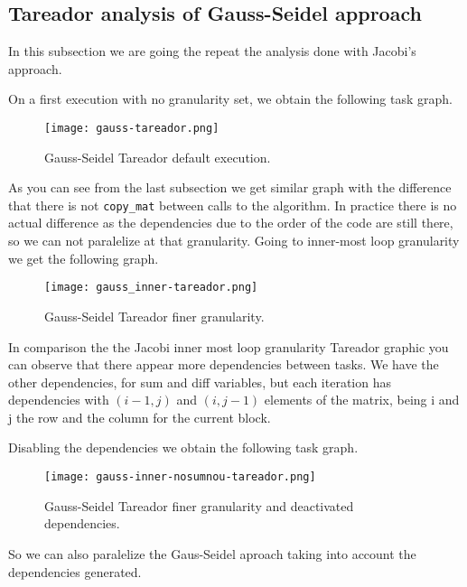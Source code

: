 \subsection{Tareador analysis of Gauss-Seidel approach}
\justify
In this subsection we are going the repeat the analysis done with Jacobi's approach.

\justify
On a first execution with no granularity set, we obtain the following task graph.

\begin{figure}[H]
    \centering
    \texttt{[image: gauss-tareador.png]}
    \caption{Gauss-Seidel Tareador default execution.}
    \label{fig:gausstareador}
\end{figure}

\justify
As you can see from the last subsection we get similar graph with the difference that there is not \texttt{copy\_mat} between calls to the algorithm. In practice there is no actual difference as the dependencies due to the order of the code are still there, so we can not paralelize at that granularity. 
\justify
Going to inner-most loop granularity we get the following graph.

\begin{figure}[H]
    \centering
    \texttt{[image: gauss\_inner-tareador.png]}
    \caption{Gauss-Seidel Tareador finer granularity.}
    \label{fig:gaussfinne}
\end{figure}

\justify
In comparison the the Jacobi inner most loop granularity Tareador graphic you can observe that there appear more dependencies between tasks. We have the other dependencies, for sum and diff variables, but each iteration has dependencies with $(i-1,j)$ and $(i, j-1)$ elements of the matrix, being i and j the row and the column for the current block. 

\justify
Disabling the dependencies we obtain the following task graph.
\begin{figure}[H]
    \centering
    \texttt{[image: gauss-inner-nosumnou-tareador.png]}
    \caption{Gauss-Seidel Tareador finer granularity and deactivated dependencies.}
    \label{fig:gausstareadornosum}
\end{figure}
So we can also paralelize the Gaus-Seidel aproach taking into account the dependencies generated.